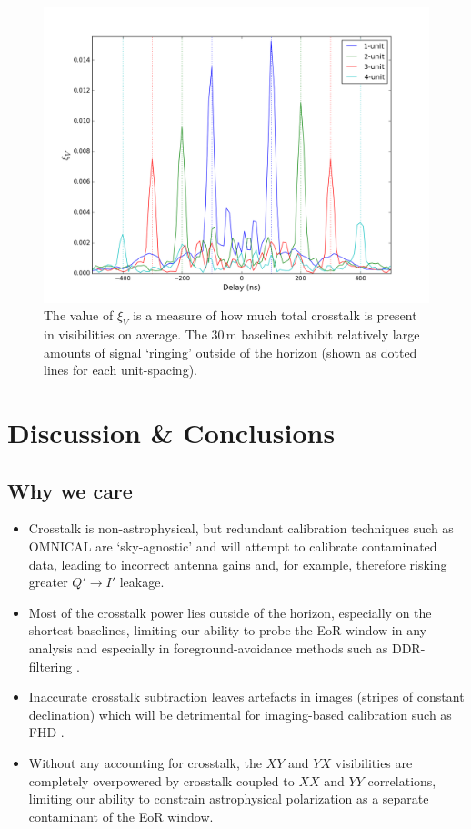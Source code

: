 \documentclass[10pt,a4paper,notitlepage]{article}
\begin{document}
\begin{figure}
\centering
\includegraphics[scale=0.5]{xi_V-zoom.png}
\caption{The value of $\xi_V$ is a measure of how much total crosstalk is present in visibilities on average. The 30\,m baselines exhibit relatively large amounts of signal `ringing' outside of the horizon (shown as dotted lines for each unit-spacing).}
\label{fig:xi_V}
\end{figure}

\section{Discussion \& Conclusions}
\label{sec:conc}

\subsection{Why we care}
\begin{itemize}
\item Crosstalk is non-astrophysical, but redundant calibration techniques such as OMNICAL \cite{Zheng} are `sky-agnostic' and will attempt to calibrate contaminated data, leading to incorrect antenna gains and, for example, therefore risking greater $Q' \rightarrow I'$ leakage.
\item Most of the crosstalk power lies outside of the horizon, especially on the shortest baselines, limiting our ability to probe the EoR window in any analysis and especially in foreground-avoidance methods such as DDR-filtering \cite{Parsons}.
\item Inaccurate crosstalk subtraction leaves artefacts in images (stripes of constant declination) which will be detrimental for imaging-based calibration such as FHD \cite{Sullivan}.
\item Without any accounting for crosstalk, the $XY$ and $YX$ visibilities are completely overpowered by crosstalk coupled to $XX$ and $YY$ correlations, limiting our ability to constrain astrophysical polarization as a separate contaminant of the EoR window.
\end{itemize}
\end{document}

